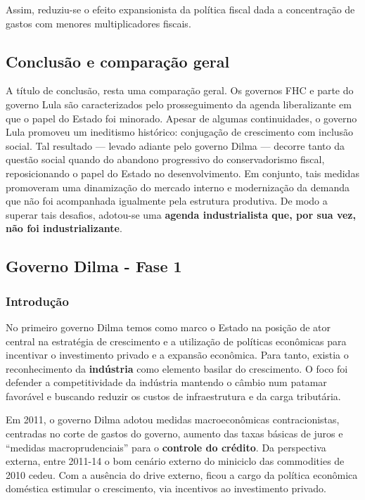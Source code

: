 \documentclass[11pt]{article}
\begin{document}
Assim, reduziu-se o efeito expansionista da política fiscal dada a concentração de gastos com menores multiplicadores fiscais.

\subsection*{Conclusão e comparação geral}
\label{sec:org2aee646}

A título de conclusão, resta uma comparação geral.
Os governos FHC e parte do governo Lula são caracterizados pelo prosseguimento da agenda liberalizante em que o papel do Estado foi minorado.
Apesar de algumas continuidades, o governo Lula promoveu um ineditismo histórico: conjugação de crescimento com inclusão social.
Tal resultado --- levado adiante pelo governo Dilma --- decorre tanto da questão social quando do abandono progressivo do conservadorismo fiscal, reposicionando o papel do Estado no desenvolvimento.
Em conjunto, tais medidas promoveram uma dinamização do mercado interno e modernização da demanda que não foi acompanhada igualmente pela estrutura produtiva.
De modo a superar tais desafios, adotou-se uma \textbf{agenda industrialista que, por sua vez, não foi industrializante}.

\subsection*{Governo Dilma - Fase 1}
\label{sec:org2f1315d}
\subsubsection*{Introdução}
\label{sec:org0d2d479}

No primeiro governo Dilma temos como marco o Estado na posição de ator central na estratégia de crescimento e a utilização de políticas econômicas para incentivar o investimento privado e a expansão econômica.
Para tanto, existia o reconhecimento da \textbf{indústria} como elemento basilar do crescimento.
O foco foi defender a competitividade da indústria mantendo o câmbio num patamar favorável e buscando reduzir os custos de infraestrutura e da carga tributária.

Em 2011, o governo Dilma adotou medidas macroeconômicas contracionistas, centradas no corte de gastos do governo, aumento das taxas básicas de juros e ``medidas macroprudenciais'' para o \textbf{controle do crédito}.
Da perspectiva externa, entre 2011-14 o bom cenário externo do miniciclo das commodities de 2010 cedeu.
Com a ausência do drive externo, ficou a cargo da política econômica doméstica estimular o crescimento, via incentivos ao investimento privado.
\end{document}
